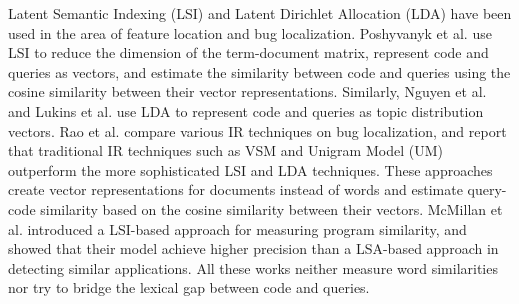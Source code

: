 Latent Semantic Indexing (LSI) and Latent Dirichlet Allocation (LDA) have been used in the area of feature location and bug localization. Poshyvanyk et al. \cite{Poshyvanyk:2007:FLU:1263152.1263534, Poshyvanyk:2006:CPR:1135772.1136177} use LSI to reduce the dimension of the term-document matrix, represent code and queries as vectors, and estimate the similarity between code and queries using the cosine similarity between their vector representations. Similarly, Nguyen et al. \cite{Nguyen:2011:TAN:2190078.2190181} and Lukins et al. \cite{Lukins:2010:BLU:1824820.1824850} use LDA to represent code and queries as topic distribution vectors. Rao et al. \cite{Rao:2011:RSL:1985441.1985451} compare various IR techniques on bug localization, and report that traditional IR techniques such as VSM and Unigram Model (UM) outperform the more sophisticated LSI and LDA techniques. These approaches create vector representations for documents instead of words and estimate query-code similarity based on the cosine similarity between their vectors. McMillan et al. \cite{Poshyvanyk:2013:CLU:2377656.2377660} introduced a LSI-based approach for measuring program similarity, and showed that their model achieve higher precision than a LSA-based approach in detecting similar applications. All these works neither measure word similarities nor try to bridge the lexical gap between code and queries.
